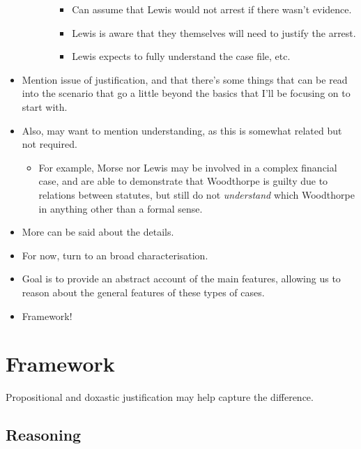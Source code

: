 \documentclass[10pt]{article}
\begin{document}
\begin{itemize}
\begin{itemize}
\begin{itemize}
      \begin{itemize}
      \item Can assume that Lewis would not arrest if there wasn't evidence.
      \item Lewis is aware that they themselves will need to justify the arrest.
      \item Lewis expects to fully understand the case file, etc.\
      \end{itemize}
    \end{itemize}
  \end{itemize}
\item Mention issue of justification, and that there's some things that can be read into the scenario that go a little beyond the basics that I'll be focusing on to start with.
\item Also, may want to mention understanding, as this is somewhat related but not required.
  \begin{itemize}
  \item For example, Morse nor Lewis may be involved in a complex financial case, and are able to demonstrate that Woodthorpe is guilty due to relations between statutes, but still do not \emph{understand} which Woodthorpe in anything other than a formal sense.
  \end{itemize}
\end{itemize}

\begin{itemize}
\item More can be said about the details.
\item For now, turn to an broad characterisation.
\item Goal is to provide an abstract account of the main features, allowing us to reason about the general features of these types of cases.
\item Framework!
\end{itemize}

\newpage


\section{Framework}
\label{sec:framework-1}

\begin{note}
  Propositional and doxastic justification may help capture the difference.
\end{note}

\subsection{Reasoning}
\label{sec:reasoning}
\end{document}
